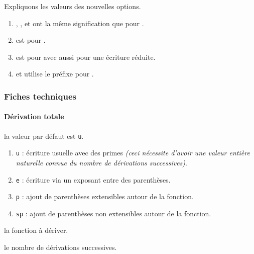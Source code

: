 \documentclass[12pt,a4paper]{article}
\begin{document}
\begin{remark}
	Expliquons les valeurs des nouvelles options.
	\begin{enumerate}
		\item {}, ,  et  ont la même signification que pour .

		\item {} est pour .

		\item {} est pour  avec aussi  pour une écriture réduite.

		\item {} et  utilise le préfixe  pour .
	\end{enumerate}
\end{remark}




\subsubsection{Fiches techniques}

\paragraph{Dérivation totale}


\IDoption{} la valeur par défaut est \verb+u+. 
\begin{enumerate}
	\item \verb+u+ : écriture usuelle avec des primes \emph{(ceci nécessite d'avoir une valeur entière naturelle connue du nombre de dérivations successives)}.

	\item \verb+e+ : écriture via un exposant entre des parenthèses.

	\item \verb+p+ : ajout de parenthèses extensibles autour de la fonction.

	\item \verb+sp+ : ajout de parenthèses non extensibles autour de la fonction.
\end{enumerate}


 la fonction à dériver.

 le nombre de dérivations successives.


\separation
\end{document}
